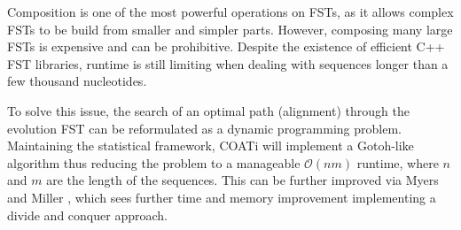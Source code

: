 Composition is one of the most powerful operations on FSTs, as it allows complex
FSTs to be build from smaller and simpler parts.
However, composing many large FSTs is expensive and can be prohibitive.
Despite the existence of efficient C++ FST libraries, runtime is still limiting
when dealing with sequences longer than a few thousand nucleotides.

To solve this issue, the search of an optimal path (alignment) through the
evolution FST can be reformulated as a dynamic programming problem.
Maintaining the statistical framework, COATi will implement a Gotoh-like
algorithm thus reducing the problem to a manageable $\mathcal{O}(nm)$
runtime, where $n$ and $m$ are the length of the sequences.
This can be further improved via Myers and Miller \parencite{myers_miller_1988},
which sees further time and memory improvement implementing a divide and conquer
approach.

